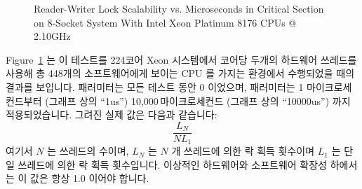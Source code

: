 \fi

\begin{figure}[tb]
\centering
{}
\caption{Reader-Writer Lock Scalability vs. Microseconds in Critical Section on 8-Socket System With Intel Xeon Platinum 8176 CPUs @ 2.10GHz}
\label{fig:toolsoftrade:Reader-Writer Lock Scalability vs. Microseconds in Critical Section}
\end{figure}

Figure~\ref{fig:toolsoftrade:Reader-Writer Lock Scalability vs. Microseconds in Critical Section}
는 이 테스트를 224코어 Xeon 시스템에서 코어당 두개의 하드웨어 쓰레드를 사용해
총 448개의 소프트웨어에게 보이는 CPU 를 가지는 환경에서 수행되었을 때의 결과를
보입니다.
 패러미터는 모든 테스트 동안 0 이었으며,  패러미터는
1 마이크로세컨드부터 (그래프 상의 ``1us'') 10,000\,마이크로세컨드 (그래프 상의
``10000us'') 까지 적용되었습니다.
그려진 실제 값은 다음과 같습니다:
\begin{equation}
	\frac{L_N}{N L_1}
\end{equation}
여기서 $N$ 는 쓰레드의 수이며, $L_N$ 는 $N$ 개 쓰레드에 의한 락 획득 횟수이며
$L_1$ 는 단일 쓰레드에 의한 락 획득 횟수입니다.
이상적인 하드웨어와 소프트웨어 확장성 하에서는 이 값은 항상 1.0 이어야 합니다.

\iffalse

